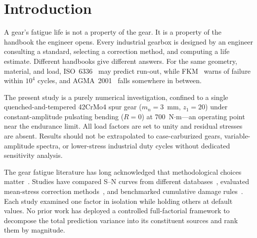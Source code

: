 \documentclass[12pt,a4paper]{article}
\begin{document}
\begin{abstract}
mean-stress contribution below the 33.9\% reported here. Whereas prior
studies---including recent work in this
journal~\cite{bonaiti2024}---ask whether two standards produce different
predictions, this study asks how much each methodological switch contributes
to total log-variance relative to all others, by simultaneous factorial
decomposition across five dimensions. To my knowledge, no prior gear fatigue study has ranked the
sources of method-induced divergence in gear fatigue life prediction by
variance explained. Predicted fatigue life spans from $3.3\times10^2$ to
$3.1\times10^7$ cycles (5.0~dex).%
All formulas have been verified against the original standards (ISO~6336-3:2019, AGMA~2001-D04,
FKM~7th~ed.); S--N parameters are from the publicly accessible Waterloo
SMDIdbase.

\textbf{Keywords:} gear fatigue, uncertainty quantification, AFT survival analysis,
surface roughness, ISO 6336, AGMA 2001, FKM, S--N curve
\end{abstract}

\section{Introduction}
\label{sec:intro}

A gear's fatigue life is not a property of the gear. It is a property
of the handbook the engineer opens. Every industrial gearbox is designed
by an engineer consulting a standard, selecting a correction method, and
computing a life estimate. Different handbooks give different answers.
For the same geometry, material, and load, ISO~6336~\cite{iso6336} may
predict run-out, while FKM~\cite{fkm} warns of failure within $10^4$
cycles, and AGMA~2001~\cite{agma2001} falls somewhere in between.

The present study is a purely numerical investigation, confined to a
single quenched-and-tempered 42CrMo4 spur gear ($m_n=3$~mm,
$z_1=20$) under constant-amplitude pulsating bending ($R=0$) at
700~N$\cdot$m---an operating point near the endurance limit. All
load factors are set to unity and residual stresses are absent.
Results should not be extrapolated to case-carburized gears,
variable-amplitude spectra, or lower-stress industrial duty cycles
without dedicated sensitivity analysis.

The gear fatigue literature has long acknowledged that methodological
choices matter~\cite{stephens2001, dowling2013}. Studies have compared
S--N curves from different databases~\cite{waterloo_fde}, evaluated
mean-stress correction methods~\cite{dowling2009}, and benchmarked
cumulative damage rules~\cite{fatemi1998}. Each study examined one
factor in isolation while holding others at default values. No prior
work has deployed a controlled full-factorial framework to decompose
the total prediction variance into its constituent sources and rank
them by magnitude.
\end{document}
